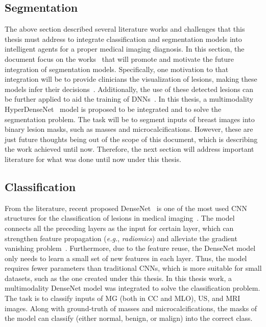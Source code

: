 \subsection{Segmentation}
\label{sec:chap003007001}

The above section described several literature works and challenges that this thesis must address to integrate classification and segmentation models into intelligent agents for a proper medical imaging diagnosis.
In this section, the document focus on the works~\cite{7412749, Dabbous397} that will promote and motivate the future integration of segmentation models.
Specifically, one motivation to that integration will be to provide clinicians the visualization of lesions, making these models infer their decisions~\cite{CHOUGRAD201819, doi:10.1148/radiol.2018181371}.
Additionally, the use of these detected lesions can be further applied to aid the training of \acp{DNN}~\cite{8032490, 8861376}.
In this thesis, a multimodality HyperDenseNet~\cite{8515234} model is proposed to be integrated and to solve the segmentation problem.
The task will be to segment inputs of breast images into binary lesion masks, such as masses and microcalcifications.
However, these are just future thoughts being out of the scope of this document, which is describing the work achieved until now.
Therefore, the next section will address important literature for what was done until now under this thesis.

\subsection{Classification}
\label{sec:chap003007002}

From the literature, recent proposed \ac{DenseNet}~\cite{Huang_2017_CVPR} is one of the most used \ac{CNN} structures for the classification of lesions in medical imaging~\cite{LIU2019e271}.
The model connects all the preceding layers as the input for certain layer, which can strengthen feature propagation ({\it e.g.}, {\it radiomics}) and alleviate the gradient vanishing problem~\cite{10.1145/3136755.3143016}.
Furthermore, due to the feature reuse, the \ac{DenseNet} model only needs to learn a small set of new features in each layer.
Thus, the model requires fewer parameters than traditional \acp{CNN}, which is more suitable for small datasets, such as the one created under this thesis.
In this thesis work, a multimodality \ac{DenseNet} model was integrated to solve the classification problem.
The task is to classify inputs of \ac{MG} (both in \ac{CC} and \ac{MLO}), \ac{US}, and \ac{MRI} images.
Along with ground-truth of masses and microcalcifications, the masks of the model can classify (either normal, benign, or malign) into the correct class.

